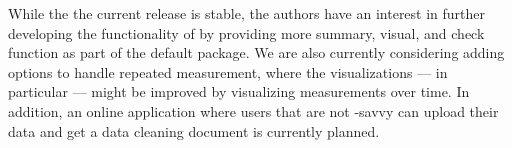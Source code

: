 \documentclass[article,shortnames]{jss}
\newcommand{\hl}[1]{\textcolor{magenta}{#1}}
\begin{document}
While the the current release is stable, the authors have an interest
in further developing the functionality of  by providing
more summary, visual, and check function as part of the default
package. We are also currently considering adding options to handle
repeated measurement, where the visualizations --- in particular ---
might be improved by visualizing measurements over time. In addition,
an online  application where users that are not
-savvy can upload their data and get a data cleaning
document is currently planned.



\nocite{R}
\nocite{shiny}
\nocite{cleanR}
\nocite{rmarkdown}
\nocite{ggplot2}
\nocite{plyr}
\nocite{data.table}
\nocite{validate}
\nocite{editrules}
\nocite{janitor}
\nocite{DataCombine}
\nocite{txtplot}

% 



\appendix
\newpage

% 








\end{document}
